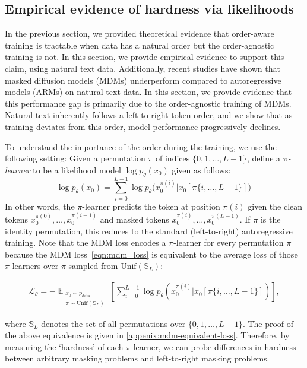 \documentclass{article}
\newcommand{\E}{\mathbb{E}}
\theoremstyle{plain}
\theoremstyle{definition}
\theoremstyle{remark}
\newcounter{theo}
\begin{document}
\subsection{Empirical evidence of hardness via likelihoods}
\label{sec:hardness_text}

In the previous section, we provided theoretical evidence that order-aware training is tractable when data has a natural order but the order-agnostic training is not. In this section, we provide empirical evidence to support this claim, using natural text data. Additionally, recent studies \cite{nie2024scaling, zheng2024maskeddiffusionmodelssecretly} have shown that masked diffusion models (MDMs) underperform compared to autoregressive models (ARMs) on natural text data. In this section, we provide evidence that this performance gap is primarily due to the order-agnostic training of MDMs. Natural text inherently follows a left-to-right token order, and we show that as training deviates from this order, model performance progressively declines.

To understand the importance of the order during the training, we use the following setting: Given a permutation $\pi$ of indices $\{0,1, \ldots, L-1 \}$, define a \emph{$\pi$-learner} to be a likelihood model $\log p_{\theta}(x_0)$ given as follows: 
\begin{equation}
\label{eq:pi-learner-likelihood}
    \log p_{\theta}(x_0) = \sum_{i=0}^{L-1} \log p_\theta \bigl( x_0^{\pi(i)} \Big| x_0 [\pi\{i,\ldots,L-1\}] \bigr)\,
\end{equation}
In other words, the $\pi$-learner predicts the token at position $\pi(i)$ given the clean tokens $x_0^{\pi(0)},\ldots, x_0^{\pi(i-1)}$ and masked tokens $x_0^{\pi(i)},\ldots, x_0^{\pi(L-1)}$. If $\pi$ is the identity permutation, this reduces to the standard (left-to-right) autoregressive training. Note that the MDM loss encodes a $\pi$-learner for every permutation $\pi$ because
the MDM loss~\eqref{eqn:mdm_loss} is equivalent to the average loss of those $\pi$-learners over $\pi$ sampled from $\mathrm{Unif}(\mathbb{S}_L)$:

{\small
\begin{align*}
    \mathcal{L}_\theta =- \mathop{\E}_{\substack{ x_0 \sim p_{\textrm{data}} \\ \pi \sim \textrm{Unif}(\mathbb S_L) }} \left[\sum_{i=0}^{L-1} \log p_\theta \left( x_0^{\pi(i)} \Big| x_0 [\pi\{i,\ldots,L-1\}] \right) \right],
\end{align*}}

where $\mathbb{S}_L$ denotes the set of all permutations over $\{0, 1, \ldots, L-1\}$. The proof of the above equivalence is given in \cref{appenix:mdm-equivalent-loss}. Therefore, by measuring the `hardness' of each $\pi$-learner, we can probe differences in hardness between arbitrary masking problems and left-to-right masking problems.
\end{document}
